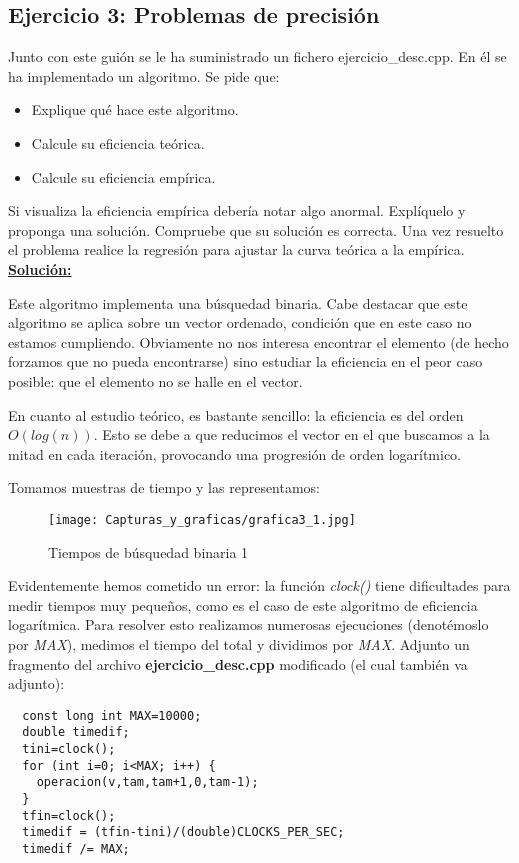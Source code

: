 \documentclass[11pt,a4paper]{article}
\begin{document}
\subsection{Ejercicio 3: Problemas de precisión}
Junto con este guión se le ha suministrado un fichero ejercicio\_desc.cpp. En él se ha implementado un algoritmo. Se pide que:
\begin{itemize}
	\item Explique qué hace este algoritmo.
	\item Calcule su eficiencia teórica.
	\item Calcule su eficiencia empírica.
\end{itemize}
Si visualiza la eficiencia empírica debería notar algo anormal. Explíquelo y proponga una solución. Compruebe que su solución es correcta. Una vez resuelto el problema realice la regresión para ajustar la curva teórica a la empírica. \\

\textbf{\underline{Solución:}}

Este algoritmo implementa una búsquedad binaria. Cabe destacar que este algoritmo se aplica sobre un vector ordenado, condición que en este caso no estamos cumpliendo. Obviamente no nos interesa encontrar el elemento (de hecho forzamos que no pueda encontrarse) sino estudiar la eficiencia en el peor caso posible: que el elemento no se halle en el vector.

En cuanto al estudio teórico, es bastante sencillo: la eficiencia es del orden $O(log(n))$. Esto se debe a que reducimos el vector en el que buscamos a la mitad en cada iteración, provocando una progresión de orden logarítmico.

Tomamos muestras de tiempo y las representamos:

\begin{figure}[H]
	\centering
	\texttt{[image: Capturas\_y\_graficas/grafica3\_1.jpg]}
	\caption{Tiempos de búsquedad binaria 1}
\end{figure}

Evidentemente hemos cometido un error: la función \emph{clock()} tiene dificultades para medir tiempos muy pequeños, como es el caso de este algoritmo de eficiencia logarítmica. Para resolver esto realizamos numerosas ejecuciones (denotémoslo por \emph{MAX}), medimos el tiempo del total y dividimos por \emph{MAX}. Adjunto un fragmento del archivo \textbf{ejercicio\_desc.cpp} modificado (el cual también va adjunto):

\begin{lstlisting}
  const long int MAX=10000;
  double timedif;
  tini=clock();
  for (int i=0; i<MAX; i++) {
    operacion(v,tam,tam+1,0,tam-1);
  }
  tfin=clock();
  timedif = (tfin-tini)/(double)CLOCKS_PER_SEC;
  timedif /= MAX;
\end{lstlisting}
\end{document}
